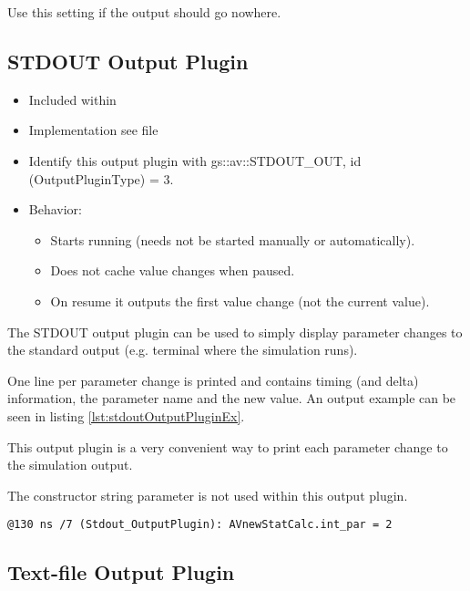 Use this setting if the output should go nowhere.

\subsection{STDOUT Output Plugin}
\label{GAVOPstdout}

\begin{itemize}
  \item Included within 
  \item Implementation see file 
  \item Identify this output plugin with {\sffamily gs::av::STDOUT\_OUT}, \newline
           id ({\sffamily OutputPluginType}) = 3.
  \item Behavior:
    \begin{itemize}
        \item Starts running (needs not be started manually or automatically).
        \item Does not cache value changes when paused.
        \item On resume it outputs the first value change (not the current value).
    \end{itemize}
\end{itemize}

The STDOUT output plugin can be used to simply display parameter changes to the standard output (e.g. terminal where the simulation runs).

One line per parameter change is printed and contains timing (and delta) information, the parameter name and the new value. An output example can be seen in listing \ref{lst:stdoutOutputPluginEx}.

This output plugin is a very convenient way to print each parameter change to the simulation output.

The constructor string parameter is not used within this output plugin.

\begin{lstlisting}[caption={STDOUT output example}, label=lst:stdoutOutputPluginEx]
@130 ns /7 (Stdout_OutputPlugin): AVnewStatCalc.int_par = 2
\end{lstlisting}


\subsection{Text-file Output Plugin}
\label{GAVOPfile}

